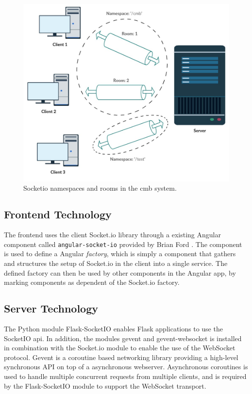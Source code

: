 \begin{figure}
    \includegraphics[width=1.0\textwidth]{figs/namespaces_and_rooms.jpg}
    \caption[Socketio namespaces and rooms in the \gls{cmb} system]{Socketio namespaces and rooms in the \gls{cmb} system. }
    \label{fig:namespaces-and-rooms}
\end{figure}

\subsection{Frontend Technology}
The frontend uses the client Socket.io library \cite{SOCKETIO} through a existing Angular component called \texttt{angular-socket-io} provided by Brian Ford \cite{ANGULARSOCKETIO}. The component is used to define a Angular \textit{factory}, which is simply a component that gathers and structures the setup of Socket.io in the client into a single service. The defined factory can then be used by other components in the Angular app, by marking components as dependent of the Socket.io factory. \\

\subsection{Server Technology}
The Python module Flask-SocketIO \cite{FLASKSOCKETIO} enables Flask applications to use the SocketIO \gls{api}. In addition, the modules gevent \cite{GEVENT} and gevent-websocket \cite{GEVENTWEBSOCKET} is installed in combination with the Socket.io module to enable the use of the WebSocket protocol. Gevent is a coroutine based networking library providing a high-level synchronous API on top of a asynchronous webserver. Asynchronous coroutines is used to handle multiple concurrent requests from multiple clients, and is required by the Flask-SocketIO module to support the WebSocket transport. \\

